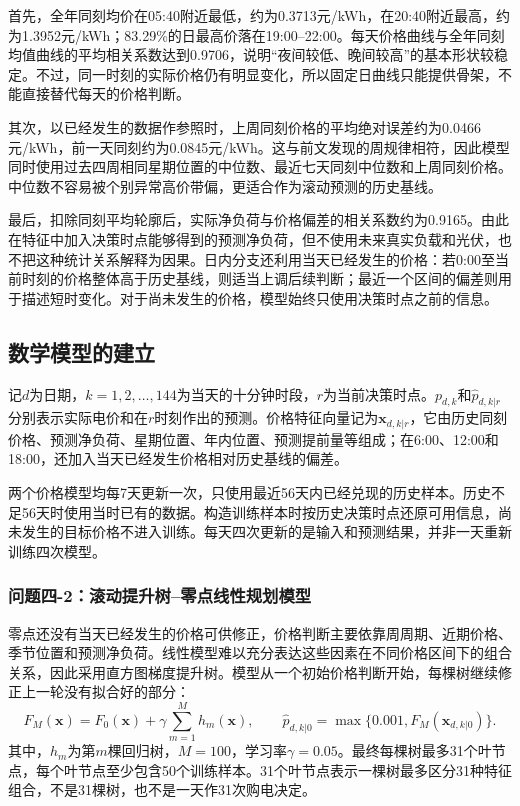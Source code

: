 首先，全年同刻均价在05:40附近最低，约为0.3713元/kWh，在20:40附近最高，约为1.3952元/kWh；83.29\%的日最高价落在19:00--22:00。每天价格曲线与全年同刻均值曲线的平均相关系数达到0.9706，说明“夜间较低、晚间较高”的基本形状较稳定。不过，同一时刻的实际价格仍有明显变化，所以固定日曲线只能提供骨架，不能直接替代每天的价格判断。

其次，以已经发生的数据作参照时，上周同刻价格的平均绝对误差约为0.0466元/kWh，前一天同刻约为0.0845元/kWh。这与前文发现的周规律相符，因此模型同时使用过去四周相同星期位置的中位数、最近七天同刻中位数和上周同刻价格。中位数不容易被个别异常高价带偏，更适合作为滚动预测的历史基线。

最后，扣除同刻平均轮廓后，实际净负荷与价格偏差的相关系数约为0.9165。由此在特征中加入决策时点能够得到的预测净负荷，但不使用未来真实负载和光伏，也不把这种统计关系解释为因果。日内分支还利用当天已经发生的价格：若0:00至当前时刻的价格整体高于历史基线，则适当上调后续判断；最近一个区间的偏差则用于描述短时变化。对于尚未发生的价格，模型始终只使用决策时点之前的信息。

\subsection{数学模型的建立}

记$d$为日期，$k=1,2,\ldots,144$为当天的十分钟时段，$r$为当前决策时点。$p_{d,k}$和$\widehat p_{d,k|r}$分别表示实际电价和在$r$时刻作出的预测。价格特征向量记为$\boldsymbol x_{d,k|r}$，它由历史同刻价格、预测净负荷、星期位置、年内位置、预测提前量等组成；在6:00、12:00和18:00，还加入当天已经发生价格相对历史基线的偏差。

两个价格模型均每7天更新一次，只使用最近56天内已经兑现的历史样本。历史不足56天时使用当时已有的数据。构造训练样本时按历史决策时点还原可用信息，尚未发生的目标价格不进入训练。每天四次更新的是输入和预测结果，并非一天重新训练四次模型。

\subsubsection{问题四-2：滚动提升树--零点线性规划模型}

零点还没有当天已经发生的价格可供修正，价格判断主要依靠周周期、近期价格、季节位置和预测净负荷。线性模型难以充分表达这些因素在不同价格区间下的组合关系，因此采用直方图梯度提升树。模型从一个初始价格判断开始，每棵树继续修正上一轮没有拟合好的部分：
\begin{equation}
 F_M(\boldsymbol x)=F_0(\boldsymbol x)+\gamma\sum_{m=1}^{M}h_m(\boldsymbol x),
 \qquad \widehat p_{d,k|0}=\max\{0.001,F_M(\boldsymbol x_{d,k|0})\}.
 \label{eq:q42tree}
\end{equation}
其中，$h_m$为第$m$棵回归树，$M=100$，学习率$\gamma=0.05$。最终每棵树最多31个叶节点，每个叶节点至少包含50个训练样本。31个叶节点表示一棵树最多区分31种特征组合，不是31棵树，也不是一天作31次购电决定。

